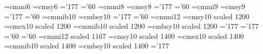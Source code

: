 %
%
\font\sixi=cmmi6
\font\sixsy=cmsy6
\skewchar\sixi='177
\skewchar\sixsy='60
\font\eighti=cmmi8
\font\eightsy=cmsy8
\skewchar\eighti='177
\skewchar\eightsy='60
\font\ninei=cmmi9
\font\ninesy=cmsy9
\skewchar\ninei='177
\skewchar\ninesy='60
\font\tenmib=cmmib10
\font\tenbsy=cmbsy10
\skewchar\tenmib='177
\skewchar\tenbsy='60
\font\twelvei=cmmi12
\font\twelvesy=cmsy10 scaled 1200
\font\twelveex=cmex10 scaled 1200
\font\twelvemib=cmmib10 scaled 1200
\font\twelvebsy=cmbsy10 scaled 1200
\skewchar\twelvei='177
\skewchar\twelvemib='177
\skewchar\twelvesy='60
\skewchar\twelvebsy='60
\font\fourteeni=cmmi12 scaled 1167
\font\fourteensy=cmsy10 scaled 1400
\font\fourteenex=cmex10 scaled 1400
\font\fourteenmib=cmmib10 scaled 1400
\font\fourteenbsy=cmbsy10 scaled 1400
\skewchar\fourteeni='177
